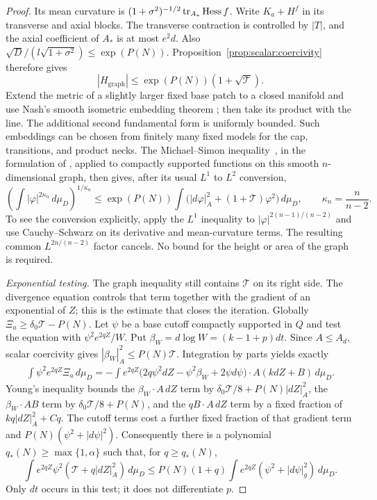 \begin{proof}
Its mean curvature is
$(1+\sigma^2)^{-1/2}\operatorname{tr}_{A_*}\operatorname{Hess} f$.  Write
$K_a+H^f$ in its transverse and axial blocks.  The transverse
contraction is controlled by $|T|$, and the axial coefficient of
$A_*$ is at most $e^2d$.  Also
$\sqrt D/(l\sqrt{1+\sigma^2})\le\exp(P(N))$.
Proposition~\ref{prop:scalar:coercivity} therefore gives
\[
 |H_{\mathrm{graph}}|\le\exp(P(N))(1+\sqrt{\mathcal T}).
\]
Extend the metric of a slightly larger fixed base patch to a closed
manifold and use Nash's smooth isometric embedding theorem
\cite{Nash1956}; then take its product with the line.  The additional second
fundamental form is uniformly bounded.  Such embeddings can be chosen
from finitely many fixed models for the cap, transitions, and product
necks. The Michael--Simon inequality~\cite{MichaelSimon1973}, in the
formulation of \cite[Chapter~4, Section~6, Theorem~6.7]{SimonGMT},
applied to compactly supported functions on this smooth $n$-dimensional graph,
then gives, after its usual $L^1$ to $L^2$ conversion,
\begin{equation}\label{eq:elliptic:graph-sobolev}
 \left(\int |\varphi|^{2\kappa_n}\,d\mu_D\right)^{1/\kappa_n}
 \le\exp(P(N))\int
       \bigl(|d\varphi|_A^2+(1+\mathcal T)\varphi^2\bigr)\,d\mu_D,
 \qquad \kappa_n=\frac n{n-2}.
\end{equation}
To see the conversion explicitly, apply the $L^1$ inequality to
$|\varphi|^{2(n-1)/(n-2)}$ and use Cauchy--Schwarz on its derivative
and mean-curvature terms.  The resulting common
$L^{2n/(n-2)}$ factor cancels.  No bound for the height or area of the
graph is required.

\medskip\noindent\emph{Exponential testing.}
The graph inequality still contains $\mathcal T$ on its right side.
The divergence equation controls that term together with the gradient
of an exponential of $Z$; this is the estimate that closes the iteration.
Globally $\Xi_a\ge\delta_0\mathcal T-P(N)$.
Let $\psi$ be a base cutoff compactly supported in $Q$ and test the
equation with $\psi^2e^{2qZ}/W$.  Put
$\beta_W=d\log W=(k-1+p)dt$.
Since $A\le A_d$, scalar coercivity gives
$|\beta_W|_A^2\le P(N)\mathcal T$.
Integration by parts yields exactly
\begin{align*}
 \int \psi^2e^{2qZ}\Xi_a\,d\mu_D
 =-\int e^{2qZ}
  \bigl(2q\psi^2dZ-\psi^2\beta_W+2\psi d\psi\bigr)
                   \cdot A(kdZ+B)\,d\mu_D.
\end{align*}
Young's inequality bounds the $\beta_W\cdot A\,dZ$ term by
$\delta_0\mathcal T/8+P(N)|dZ|_A^2$, the $\beta_W\cdot AB$
term by $\delta_0\mathcal T/8+P(N)$, and the $qB\cdot A\,dZ$
term by a fixed fraction of $kq|dZ|_A^2+C q$.
The cutoff terms cost a further fixed fraction of that gradient term
and $P(N)(\psi^2+|d\psi|^2)$.
Consequently there is a polynomial $q_*(N)\ge\max\{1,\alpha\}$ such
that, for $q\ge q_*(N)$,
\begin{equation}\label{eq:elliptic:exponential-energy}
 \int e^{2qZ}\psi^2
           (\mathcal T+q|dZ|_A^2)\,d\mu_D
 \le P(N)(1+q)\int e^{2qZ}
                    (\psi^2+|d\psi|_g^2)\,d\mu_D.
\end{equation}
Only $dt$ occurs in this test; it does not differentiate $p$.


\end{proof}
